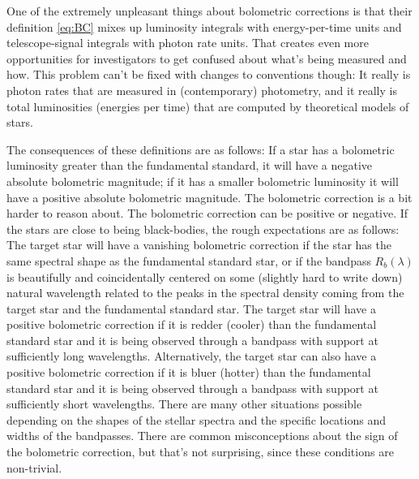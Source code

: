 \documentclass[10pt]{article}
\begin{document}
One of the extremely unpleasant things about bolometric corrections is that their definition \eqref{eq:BC} mixes up luminosity integrals with energy-per-time units and telescope-signal integrals with photon rate units.
That creates even more opportunities for investigators to get confused about what's being measured and how.
This problem can't be fixed with changes to conventions though:
It really is photon rates that are measured in (contemporary) photometry, and it really is total luminosities (energies per time) that are computed by theoretical models of stars.

The consequences of these definitions are as follows:
If a star has a bolometric luminosity greater than the fundamental standard, it will have a negative absolute bolometric magnitude; if it has a smaller bolometric luminosity it will have a positive absolute bolometric magnitude.
The bolometric correction is a bit harder to reason about.
The bolometric correction can be positive or negative.
If the stars are close to being black-bodies, the rough expectations are as follows:
The target star will have a vanishing bolometric correction if the star has the same spectral shape as the fundamental standard star, or if the bandpass $R_b(\lambda)$ is beautifully and coincidentally centered on some (slightly hard to write down) natural wavelength related to the peaks in the spectral density coming from the target star and the fundamental standard star.
The target star will have a positive bolometric correction if it is redder (cooler) than the fundamental standard star and it is being observed through a bandpass with support at sufficiently long wavelengths.
Alternatively, the target star can also have a positive bolometric correction if it is bluer (hotter) than the fundamental standard star and it is being observed through a bandpass with support at sufficiently short wavelengths.
There are many other situations possible depending on the shapes of the stellar spectra and the specific locations and widths of the bandpasses.
There are common misconceptions about the sign of the bolometric correction, but that's not surprising, since these conditions are non-trivial.
\end{document}
